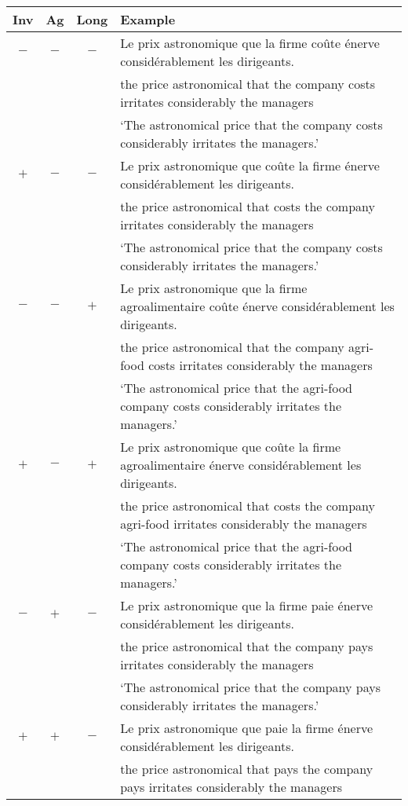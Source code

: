 \documentclass[output=paper]{langscibook}
\begin{document}
\begin{sidewaystable}
\small
  \begin{tabular}{cccl} 
   \lsptoprule
 Inv & Ag & Long & Example\\
   \midrule
 $-$ & $-$ &  $-$  & Le prix astronomique que la firme coûte énerve considérablement les dirigeants. \\
 & & & the price astronomical that the company costs irritates considerably the managers \\
 & & & `The astronomical price that the company costs considerably irritates the managers.' \\
$+$ & $-$ &  $-$  &	Le prix astronomique que coûte la firme énerve considérablement les dirigeants. \\
& & & the price astronomical that costs the company irritates considerably the managers \\
& & & `The astronomical price that the company costs considerably irritates the managers.' \\
$-$ & $-$ &  $+$  & 	Le prix astronomique que la firme agroalimentaire coûte énerve considérablement les dirigeants. \\
& & & the price astronomical that the company agri-food  costs irritates considerably the managers \\
& & & `The astronomical price that the agri-food company costs considerably irritates the managers.'\\
$+$ & $-$ &  $+$  &	Le prix astronomique que coûte la firme agroalimentaire énerve considérablement les dirigeants.\\
& & & the price astronomical that costs the company agri-food irritates considerably the managers \\
& & & `The astronomical price that the agri-food company costs considerably irritates the managers.'\\
$-$ & $+$ & $-$  &	Le prix astronomique que la firme paie énerve considérablement les dirigeants.\\
& & & the price astronomical that the company pays irritates considerably the managers \\
& & & `The astronomical price that the company pays considerably irritates the managers.' \\
$+$ & $+$ & $-$   &	Le prix astronomique que paie la firme énerve considérablement les dirigeants.\\
& & & the price astronomical that pays the company pays irritates considerably the managers \\

\end{tabular}
\end{sidewaystable}
\end{document}

